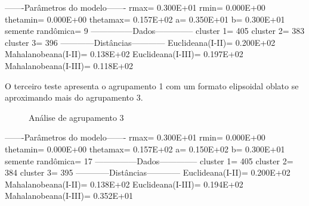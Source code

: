 -------Parâmetros do modelo-------
 rmax=     0.300E+01
 rmin=     0.000E+00
 thetamin=     0.000E+00
 thetamax=     0.157E+02
 a=     0.350E+01
 b=     0.300E+01
 semente randômica=           9
 ---------------Dados--------------
 cluster 1=         405
 cluster 2=         383
 cluster 3=         396
 ------------Distâncias------------
 Euclideana(I-II)=     0.200E+02
 Mahalanobeana(I-II)=     0.138E+02
 Euclideana(I-III)=     0.197E+02
 Mahalanobeana(I-III)=     0.118E+02

O terceiro teste apresenta o agrupamento 1 com um formato elipsoidal oblato se aproximando mais do agrupamento 3. 

\begin{figure}[H]
	\centering
	\setlength{\fboxsep}{8pt}
	\setlength{\fboxrule}{0.1pt}
	\caption{Análise de agrupamento 3}
	\label{AC3}
\end{figure}

 -------Parâmetros do modelo-------
 rmax=     0.300E+01
 rmin=     0.000E+00
 thetamin=     0.000E+00
 thetamax=     0.157E+02
 a=     0.150E+02
 b=     0.300E+01
 semente randômica=          17
 ---------------Dados--------------
 cluster 1=         405
 cluster 2=         384
 cluster 3=         395
 ------------Distâncias------------
 Euclideana(I-II)=     0.200E+02
 Mahalanobeana(I-II)=     0.138E+02
 Euclideana(I-III)=     0.194E+02
 Mahalanobeana(I-III)=     0.352E+01




